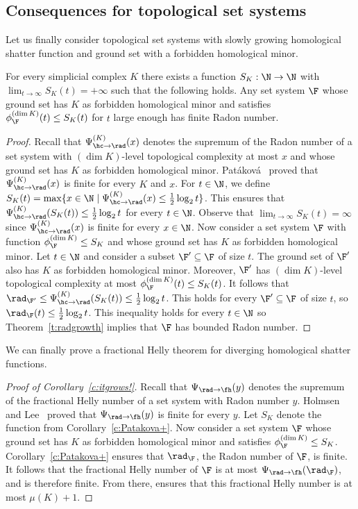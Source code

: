 \subsection{Consequences for topological set systems}
%
Let us finally consider topological set systems with slowly growing homological shatter function and ground set with a forbidden homological minor.
%
\begin{corollary}\label{c:Patakova+}
  For every simplicial complex $K$ there exists a function $S_K : \N \to \N$ with $\lim_{t \to \infty} S_K(t) = +\infty$ such that the following holds. Any set system $\F$ whose ground set has $K$ as forbidden homological minor and satisfies $\phi_{\F}^{(\dim K)}(t) \le S_K(t)$ for $t$ large enough has finite Radon number.  
\end{corollary}
\begin{proof}
  Recall that $\Psi^{(K)}_{\hc \to \rad}(x)$ denotes the supremum of the Radon number of a set system with $(\dim K)$-level topological complexity at most $x$ and whose ground set has $K$ as forbidden homological minor. Patáková~\cite{patakova2022bounding} proved that $\Psi^{(K)}_{\hc \to \rad}(x)$ is finite for every $K$ and $x$.
%
  \medskip
%
  For $t \in \N$, we define $S_K(t) =\max\{x\in\N\mid \Psi^{(K)}_{\hc \to \rad}(x) \le \frac12 \log_2 t\}$. This ensures that $\Psi^{(K)}_{\hc \to \rad}(S_K(t)) \le \frac12 \log_2 t$ for every $t \in \N$.    Observe that $\lim_{t \to \infty} S_K(t) = \infty$ since $\Psi^{(K)}_{\hc \to \rad}(x)$ is finite for every $x \in \N$.
%
  \medskip
%
  Now consider a set system $\F$ with function $\phi_{\F}^{(\dim K)} \le S_K$ and whose ground set has $K$ as forbidden homological minor. Let $t \in \N$ and consider a subset $\F' \subseteq \F$ of size $t$. The ground set of $\F'$ also has $K$ as forbidden homological minor. Moreover, $\F'$ has  $(\dim K)$-level topological complexity at most $\phi_{\F}^{(\dim K)}(t) \le S_K(t)$. It follows that $\rad_{\F'} \le \Psi^{(K)}_{\hc \to \rad}(S_K(t)) \le \frac12 \log_2 t$. This holds for every $\F' \subseteq \F$ of size $t$, so $\rad_\F(t) \le \frac12 \log_2 t$. This inequality holds for every $t \in \N$ so Theorem~\ref{t:radgrowth} implies that $\F$ has bounded Radon number.
\end{proof}
%
\noindent
We can finally prove a fractional Helly theorem for diverging homological shatter functions.
%
\begin{proof}[Proof of Corollary~\ref{c:itgrows!}]
  Recall that $\Psi_{\rad \to \fh}(y)$ denotes the supremum of the fractional Helly number of a set system with Radon number $y$. Holmsen and Lee~\cite[Theorem~1.1]{Holmsen2021} proved that $\Psi_{\rad \to \fh}(y)$ is finite for every $y$. Let $S_K$ denote the function from Corollary~\ref{c:Patakova+}. Now consider a set system $\F$ whose ground set has $K$ as forbidden homological minor and satisfies $\phi_{\F}^{(\dim K)} \le S_K$. Corollary~\ref{c:Patakova+} ensures that $\rad_\F$, the Radon number of $\F$, is finite. It follows that the fractional Helly number of $\F$ is at most $\Psi_{\rad \to \fh}(\rad_\F)$, and is therefore finite. From there, \cite[Theorem~1.2]{steppingUp} ensures that this fractional Helly number is at most $\mu(K)+1$.
\end{proof}
%
%
%
